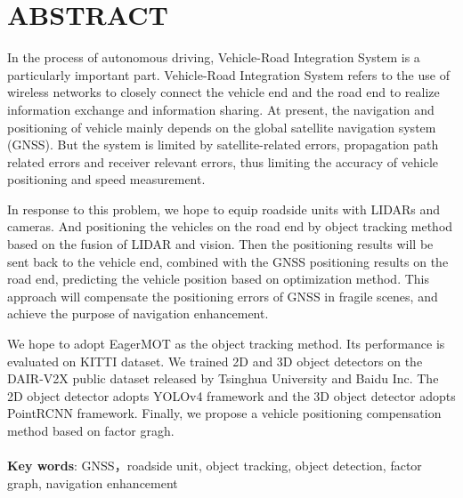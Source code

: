 \newpage
{}
\section*{ABSTRACT}

\hspace{8mm}
In the process of autonomous driving, Vehicle-Road Integration System is a particularly important part. Vehicle-Road Integration System refers to the use of wireless networks to closely connect the vehicle end and the road end to realize information exchange and information sharing. At present, the navigation and positioning of vehicle mainly depends on the global satellite navigation system (GNSS). But the system is limited by satellite-related errors, propagation path related errors and receiver relevant errors, thus limiting the accuracy of vehicle positioning and speed measurement.

In response to this problem, we hope to equip roadside units with LIDARs and cameras. And positioning the vehicles on the road end by object tracking method based on the fusion of  
LIDAR and vision. Then the positioning results will be sent back to the vehicle end, combined with the GNSS positioning results on the road end, predicting the vehicle position based on optimization method. This approach will compensate the positioning errors of GNSS in fragile scenes, and achieve the purpose of navigation enhancement.

We hope to adopt EagerMOT as the object tracking method. Its performance is evaluated on KITTI dataset. We trained 2D and 3D object detectors on the DAIR-V2X public dataset released by Tsinghua University and Baidu Inc. The 2D object detector adopts YOLOv4 framework and the 3D object detector adopts PointRCNN framework. Finally, we propose a vehicle positioning compensation method based on factor gragh.\\
~\\ 
\textbf{Key words}: GNSS，roadside unit, object tracking, object detection, factor graph, navigation enhancement
